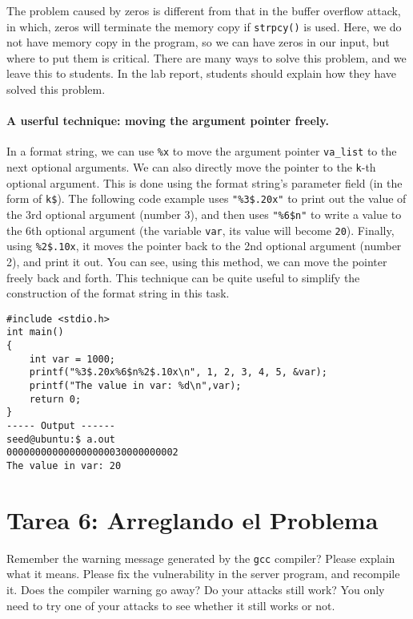 The problem caused by zeros is different from that
in the buffer overflow attack, in which,
zeros will terminate the memory copy if \texttt{strpcy()} is used. 
Here, we do not have memory copy in the program, 
so we can have zeros in our input, but where to put them
is critical. 
There are many ways to solve this problem, and 
we leave this to students. In the lab report, students
should explain how they have solved this problem. 


\paragraph{A userful technique: moving the argument pointer freely.}
In a format string, we can use \texttt{\%x} to move the
argument pointer \texttt{va\_list} to the next optional arguments.
We can also directly move the pointer to the \texttt{k}-th optional argument.
This is done using the format string's parameter field (in the form of
\texttt{k\$}).
The following code example uses \texttt{"\%3\$.20x"} to print out the value of the
3rd optional argument (number 3), and then uses \texttt{"\%6\$n"} to write
a value to the 6th optional argument (the variable \texttt{var}, its
value will become \texttt{20}). Finally,
using \texttt{\%2\$.10x}, it moves the pointer back to the 2nd
optional argument (number 2), and print it out. You can see,
using this method, we can move the pointer freely back and forth.
This technique can be quite useful to simplify the construction
of the format string in this task.

\begin{lstlisting}
#include <stdio.h>
int main()
{
    int var = 1000;
    printf("%3$.20x%6$n%2$.10x\n", 1, 2, 3, 4, 5, &var);
    printf("The value in var: %d\n",var);
    return 0;
}
----- Output ------
seed@ubuntu:$ a.out
000000000000000000030000000002
The value in var: 20
\end{lstlisting}




\section{Tarea 6: Arreglando el Problema}

Remember the warning message generated by the \texttt{gcc} compiler? Please explain what
it means. Please fix the vulnerability in the server program, and recompile it. 
Does the compiler warning go away? Do your attacks 
still work? You only need to try one of your attacks to see whether it still
works or not. 


